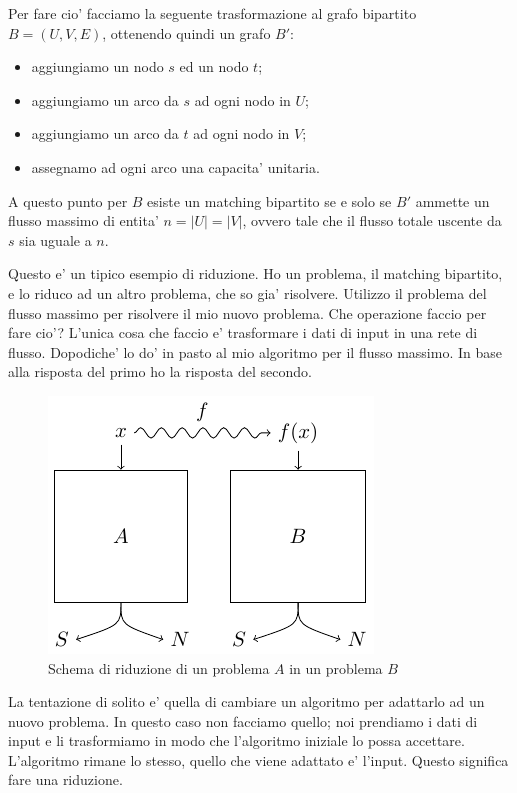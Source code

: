 Per fare cio' facciamo la seguente trasformazione al grafo bipartito $B = (U,V,E)$, ottenendo quindi un grafo
$B'$:
\begin{itemize}
    \item aggiungiamo un nodo $s$ ed un nodo $t$;
    \item aggiungiamo un arco da $s$ ad ogni nodo in $U$;
    \item aggiungiamo un arco da $t$ ad ogni nodo in $V$;
    \item assegnamo ad ogni arco una capacita' unitaria.
\end{itemize}

A questo punto per $B$ esiste un matching bipartito se e solo se $B'$ ammette un flusso massimo di
entita' $n = |U| = |V|$, ovvero tale che il flusso totale uscente da $s$ sia uguale a $n$.

Questo e' un tipico esempio di riduzione. Ho un problema, il matching bipartito, e lo riduco ad un
altro problema, che so gia' risolvere. Utilizzo il problema del flusso massimo per risolvere il mio
nuovo problema. Che operazione faccio per fare cio'? L'unica cosa che faccio e' trasformare i dati
di input in una rete di flusso. Dopodiche' lo do' in pasto al mio algoritmo per il flusso massimo.
In base alla risposta del primo ho la risposta del secondo.

\begin{figure}[h]
    \begin{center}
        \includegraphics{img/Reducibility.pdf}
    \end{center}
    \caption{Schema di riduzione di un problema $A$ in un problema $B$}
\end{figure}

La tentazione di solito e' quella di cambiare un algoritmo per adattarlo ad un nuovo problema. In
questo caso non facciamo quello; noi prendiamo i dati di input e li trasformiamo in modo che
l'algoritmo iniziale lo possa accettare. L'algoritmo rimane lo stesso, quello che viene adattato e'
l'input. Questo significa fare una riduzione.

